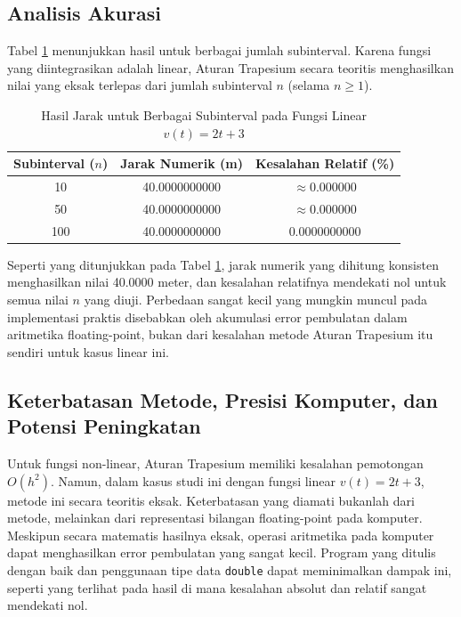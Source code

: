 \documentclass[conference]{IEEEtran}
\begin{document}
\subsection{Analisis Akurasi}
Tabel \ref{tab:results} menunjukkan hasil untuk berbagai jumlah subinterval. Karena fungsi yang diintegrasikan adalah linear, Aturan Trapesium secara teoritis menghasilkan nilai yang eksak terlepas dari jumlah subinterval \(n\) (selama \(n \ge 1\)).
\begin{table}[htbp]
\caption{Hasil Jarak untuk Berbagai Subinterval pada Fungsi Linear \(v(t)=2t+3\)}
\begin{center}
\small %
\begin{tabular}{|c|c|c|} %
\hline
\textbf{Subinterval (\( n \))} & \textbf{Jarak Numerik (m)} & \textbf{Kesalahan Relatif (\%)} \\
\hline
10 & 40.0000000000 & $\approx 0.000000$ \\ %
50 & 40.0000000000 & $\approx 0.000000$ \\ %
100 & 40.0000000000 & $0.0000000000$ \\ %
\hline
\end{tabular}
\label{tab:results}
\end{center}
\end{table}
Seperti yang ditunjukkan pada Tabel \ref{tab:results}, jarak numerik yang dihitung konsisten menghasilkan nilai 40.0000 meter, dan kesalahan relatifnya mendekati nol untuk semua nilai \( n \) yang diuji. Perbedaan sangat kecil yang mungkin muncul pada implementasi praktis disebabkan oleh akumulasi error pembulatan dalam aritmetika floating-point, bukan dari kesalahan metode Aturan Trapesium itu sendiri untuk kasus linear ini.

\subsection{Keterbatasan Metode, Presisi Komputer, dan Potensi Peningkatan}
Untuk fungsi non-linear, Aturan Trapesium memiliki kesalahan pemotongan \(O(h^2)\). Namun, dalam kasus studi ini dengan fungsi linear \(v(t) = 2t+3\), metode ini secara teoritis eksak. Keterbatasan yang diamati bukanlah dari metode, melainkan dari representasi bilangan floating-point pada komputer. Meskipun secara matematis hasilnya eksak, operasi aritmetika pada komputer dapat menghasilkan error pembulatan yang sangat kecil. Program yang ditulis dengan baik dan penggunaan tipe data \texttt{double} dapat meminimalkan dampak ini, seperti yang terlihat pada hasil di mana kesalahan absolut dan relatif sangat mendekati nol. 
\end{document}
